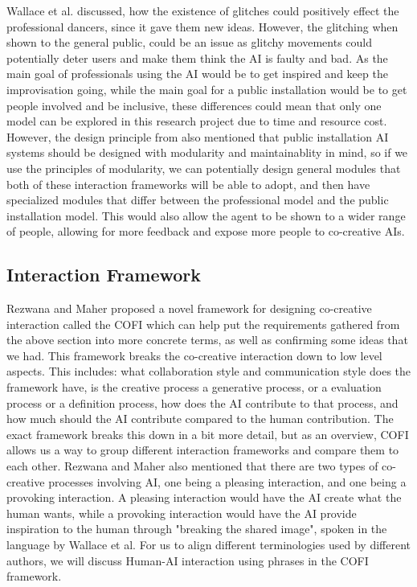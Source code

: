 \documentclass[final,5p,times,twocolumn,authoryear]{article}
\begin{document}
Wallace et al. discussed, how the existence of glitches could positively
effect the professional dancers, since it gave them new ideas. However,
the glitching when shown to the general public, could be an issue as
glitchy movements could potentially deter users and make them think the
AI is faulty and bad. As the main goal of professionals using the AI
would be to get inspired and keep the improvisation going, while the
main goal for a public installation would be to get people involved and
be inclusive, these differences could mean that only one model can be
explored in this research project due to time and resource cost.
However, the design principle from \cite{Long2019} also mentioned that
public installation AI systems should be designed with modularity and
maintainablity in mind, so if we use the principles of modularity, we
can potentially design general modules that both of these interaction
frameworks will be able to adopt, and then have specialized modules that
differ between the professional model and the public installation model.
This would also allow the agent to be shown to a wider range of people,
allowing for more feedback and expose more people to co-creative AIs.

\subsection{Interaction Framework}
Rezwana and Maher proposed a novel framework for designing co-creative
interaction called the COFI which can help put the requirements gathered
from the above section into more concrete terms, as well as confirming
some ideas that we had. This framework breaks the co-creative
interaction down to low level aspects. This includes: what collaboration style
and communication style does the framework have, is the creative process
a generative process, or a evaluation process or a definition process, how does the AI
contribute to that process, and how much should the AI contribute
compared to the human contribution. The exact framework breaks this down
in a bit more detail, but as an overview, COFI allows us a way to group
different interaction frameworks and compare them to each other. Rezwana
and Maher also mentioned that there are two types of co-creative
processes involving AI, one being a pleasing interaction, and one being
a provoking interaction. A pleasing interaction would have the AI create
what the human wants, while a provoking interaction would have the AI
provide inspiration to the human through "breaking the shared image",
spoken in the language by Wallace et al. For us to align different
terminologies used by different authors, we will discuss Human-AI
interaction using phrases in the COFI framework.
\end{document}
